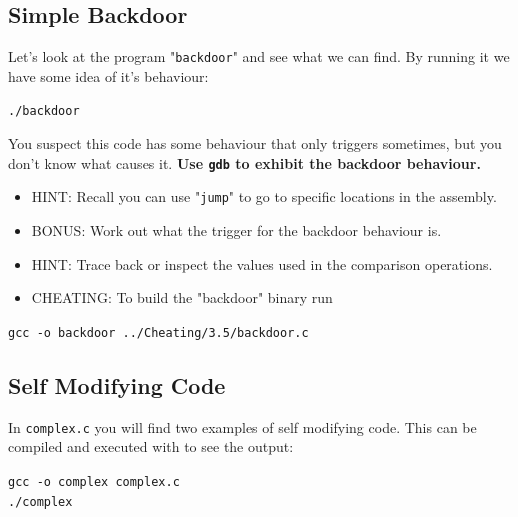 \documentclass{article}
\begin{document}
\subsection{Simple Backdoor}

Let's look at the program "\lstinline{backdoor}" and see what we can find. By running
it we have some idea of it's behaviour:
\begin{center}
    \lstinline{./backdoor}
\end{center}
\noindent You suspect this code has some behaviour that only triggers sometimes, but
you don't know what causes it.
\textbf{Use \lstinline{gdb} to exhibit the backdoor behaviour.}
\begin{itemize}
    \item HINT: Recall you can use "\lstinline{jump}" to go to specific locations in the assembly.
    \item BONUS: Work out what the trigger for the backdoor behaviour is.
    \item HINT: Trace back or inspect the values used in the comparison operations.
    \item CHEATING: To build the "backdoor" binary run
\end{itemize}
\begin{center}
    \lstinline{gcc -o backdoor ../Cheating/3.5/backdoor.c}
\end{center}

\subsection{Self Modifying Code}
In \lstinline{complex.c} you will find two examples of self modifying code. This can be compiled and executed with to see the output:
\begin{center}
    \lstinline{gcc -o complex complex.c}\\
    \lstinline{./complex}
\end{center}
\end{document}
